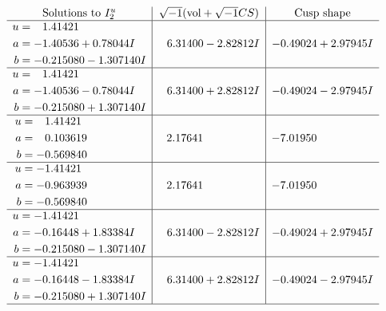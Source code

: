\documentclass[1p]{elsarticle_modified}
\theoremstyle{definition}
\newcommand{\I}{\sqrt{-1}}
\begin{document}
$$\begin{array}{c|c|c}  
\text{Solutions to }I^u_{2}& \I (\text{vol} + \sqrt{-1}CS) & \text{Cusp shape}\\
 \hline 
\begin{aligned}
u &= \phantom{-}1.41421\phantom{ +0.000000I} \\
a &= -1.40536 + 0.78044 I \\
b &= -0.215080 - 1.307140 I\end{aligned}
 & \phantom{-}6.31400 - 2.82812 I & -0.49024 + 2.97945 I \\ \hline\begin{aligned}
u &= \phantom{-}1.41421\phantom{ +0.000000I} \\
a &= -1.40536 - 0.78044 I \\
b &= -0.215080 + 1.307140 I\end{aligned}
 & \phantom{-}6.31400 + 2.82812 I & -0.49024 - 2.97945 I \\ \hline\begin{aligned}
u &= \phantom{-}1.41421\phantom{ +0.000000I} \\
a &= \phantom{-}0.103619\phantom{ +0.000000I} \\
b &= -0.569840\phantom{ +0.000000I}\end{aligned}
 & \phantom{-}2.17641\phantom{ +0.000000I} & -7.01950\phantom{ +0.000000I} \\ \hline\begin{aligned}
u &= -1.41421\phantom{ +0.000000I} \\
a &= -0.963939\phantom{ +0.000000I} \\
b &= -0.569840\phantom{ +0.000000I}\end{aligned}
 & \phantom{-}2.17641\phantom{ +0.000000I} & -7.01950\phantom{ +0.000000I} \\ \hline\begin{aligned}
u &= -1.41421\phantom{ +0.000000I} \\
a &= -0.16448 + 1.83384 I \\
b &= -0.215080 - 1.307140 I\end{aligned}
 & \phantom{-}6.31400 - 2.82812 I & -0.49024 + 2.97945 I \\ \hline\begin{aligned}
u &= -1.41421\phantom{ +0.000000I} \\
a &= -0.16448 - 1.83384 I \\
b &= -0.215080 + 1.307140 I\end{aligned}
 & \phantom{-}6.31400 + 2.82812 I & -0.49024 - 2.97945 I\\
 \hline 
 \end{array}$$\newpage\newpage\renewcommand{\arraystretch}{1}
\end{document}
